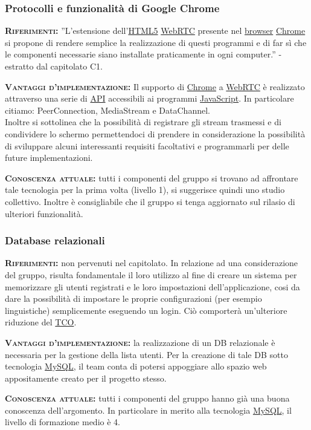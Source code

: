 \subsubsection{Protocolli e funzionalità di Google Chrome}
\begin{description}
	\item{\scshape\bfseries Riferimenti:}
  ''L'estensione dell'\underline{HTML5} \underline{WebRTC} presente nel \underline{browser} \underline{Chrome} si propone di rendere semplice la realizzazione di questi programmi e di far sì che le componenti necessarie siano installate praticamente in ogni computer.'' - estratto dal capitolato C1.
  
 	\item{\scshape\bfseries Vantaggi d'implementazione:} Il supporto di \underline{Chrome} a \underline{WebRTC} è realizzato attraverso una serie di \underline{API} accessibili ai programmi \underline{JavaScript}. In particolare citiamo: PeerConnection, MediaStream e DataChannel.\\Inoltre si sottolinea che la possibilità di registrare gli stream trasmessi e di condividere lo schermo permettendoci di prendere in considerazione la possibilità di sviluppare alcuni interessanti requisiti facoltativi e programmarli per delle future implementazioni.
	
	\item{\scshape\bfseries Conoscenza attuale:} tutti i componenti del gruppo si trovano ad affrontare tale tecnologia per la prima volta (livello 1), si suggerisce quindi uno studio collettivo. Inoltre è consigliabile che il gruppo si tenga aggiornato sul rilasio di ulteriori funzionalità.
\end{description}

\subsubsection{Database relazionali}
\begin{description}
	\item{\scshape\bfseries Riferimenti:} non pervenuti nel capitolato. In relazione ad una considerazione del gruppo, risulta fondamentale il loro utilizzo al fine di creare un sistema per memorizzare gli utenti registrati e le loro impostazioni dell'applicazione, cosi da dare la possibilità di impostare le proprie configurazioni (per esempio linguistiche) semplicemente eseguendo un login. Ciò comporterà un'ulteriore riduzione del \underline{TCO}.
  
 	\item{\scshape\bfseries Vantaggi d'implementazione:} la realizzazione di un DB relazionale è necessaria per la gestione della lista utenti. Per la creazione di tale DB sotto tecnologia \underline{MySQL}, il team conta di potersi appoggiare allo spazio web appositamente creato per il progetto stesso.
	
	\item{\scshape\bfseries Conoscenza attuale:} tutti i componenti del gruppo hanno già una buona conoscenza dell'argomento. In particolare in merito alla tecnologia \underline{MySQL}, il livello di formazione medio è 4.
\end{description}

